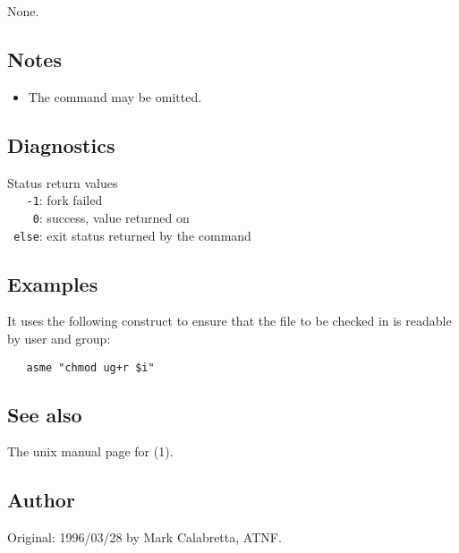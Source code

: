 None.
 
\subsection*{Notes}
 
\begin{itemize}
\item
   The command may be omitted.
\end{itemize}
 
\subsection*{Diagnostics}
 
Status return values
\\ \verb+   -1+:  fork failed
\\ \verb+    0+:  success, value returned on 
\\ \verb+ else+:  exit status returned by the command
 
\subsection*{Examples}
 
It uses the following
construct to ensure that the file to be checked in is readable by user and
group:

\begin{verbatim}
   asme "chmod ug+r $i"
\end{verbatim}
 
 
\subsection*{See also}
 
The unix manual page for (1).
 
\subsection*{Author}
 
Original: 1996/03/28 by Mark Calabretta, ATNF.


\newpage
\section{}
\label{av}

